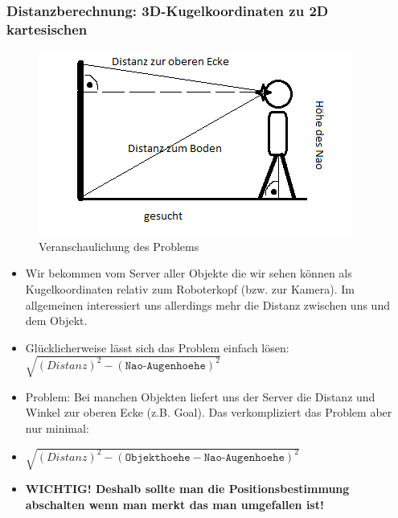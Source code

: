 \subsubsection{Distanzberechnung: 3D-Kugelkoordinaten zu 2D kartesischen}
\begin{figure}[h]
\begin{center}
\includegraphics[scale=0.6]{Distanz_3D_Kugelkoordinaten_zu_2D_kartesisch}
\end{center}
\caption{Veranschaulichung des Problems}
\end{figure}
\begin{itemize}
\item Wir bekommen vom Server aller Objekte die wir sehen können als 
Kugelkoordinaten relativ zum Roboterkopf (bzw. zur Kamera). Im 
allgemeinen interessiert uns allerdings mehr die Distanz zwischen uns 
und dem Objekt. 
\item Glücklicherweise lässt sich das Problem einfach lösen: $\sqrt{(Distanz)^2 - (\texttt{Nao-Augenhoehe})^2}$
\item Problem: Bei manchen Objekten liefert uns der Server die Distanz
 und Winkel zur oberen Ecke (z.B. Goal). Das verkompliziert das Problem 
aber nur minimal:
\item $\sqrt{(Distanz)^2 - (\texttt{Objekthoehe} - \texttt{Nao-Augenhoehe})^2}$
\item \textbf{WICHTIG! Deshalb sollte man die Positionsbestimmung abschalten wenn man merkt das man umgefallen ist!}
\end{itemize}

